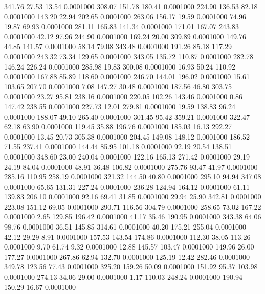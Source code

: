  341.76   27.53   13.54   0.0001000
 308.07  151.78  180.41   0.0001000
 224.90  136.53   82.18   0.0001000
 143.20   22.94  202.65   0.0001000
 263.06  156.17   19.59   0.0001000
  74.96   19.87   69.93   0.0001000
 281.11  165.83  141.34   0.0001000
 171.01  167.07  243.83   0.0001000
  42.12   97.96  244.90   0.0001000
 169.24   20.00  309.89   0.0001000
 149.76   44.85  141.57   0.0001000
  58.14   79.08  343.48   0.0001000
 191.26   85.18  117.29   0.0001000
 243.32   73.34  129.65   0.0001000
 343.05  135.72  110.87   0.0001000
 282.78  146.24  226.24   0.0001000
 285.98   19.83  300.08   0.0001000
  16.93   50.24  110.92   0.0001000
 167.88   85.89  118.60   0.0001000
 246.70  144.01  196.02   0.0001000
  15.61  103.65  207.70   0.0001000
   7.08  147.27   30.48   0.0001000
 187.56   46.80  303.75   0.0001000
  23.27   95.81  238.16   0.0001000
 220.05  102.26  143.46   0.0001000
   0.86  147.42  238.55   0.0001000
 227.73   12.01  279.81   0.0001000
  19.59  138.83   96.24   0.0001000
 188.07   49.10  265.40   0.0001000
 301.45   95.42  359.21   0.0001000
 322.47   62.18   63.90   0.0001000
 119.45   35.88  196.76   0.0001000
 185.03   16.13  292.27   0.0001000
  13.45   20.73  305.38   0.0001000
 204.45  149.08  148.12   0.0001000
 186.52   71.55  237.41   0.0001000
 144.44   85.95  101.18   0.0001000
  92.19   20.54  138.51   0.0001000
 348.60   23.00  240.04   0.0001000
 122.16  165.13  271.42   0.0001000
  29.19   24.19   84.04   0.0001000
  48.91   36.48  106.82   0.0001000
 275.76   93.47   41.97   0.0001000
 285.16  110.95  258.19   0.0001000
 321.32  144.50   40.80   0.0001000
 295.10   94.94  347.08   0.0001000
  65.65  131.31  227.24   0.0001000
 236.28  124.94  164.12   0.0001000
  61.11  139.83  206.10   0.0001000
  92.16   69.41   31.85   0.0001000
  29.94   25.90  342.81   0.0001000
 223.08  151.12   69.05   0.0001000
 290.71  116.56  304.79   0.0001000
 258.65   73.02  167.22   0.0001000
   2.65  129.85  196.42   0.0001000
  41.17   35.46  190.95   0.0001000
 343.38   64.06   98.76   0.0001000
  36.51  145.85  314.61   0.0001000
  40.20  175.21  255.04   0.0001000
  42.12   29.29    8.91   0.0001000
 157.53  143.54  174.86   0.0001000
 112.30   38.05  113.26   0.0001000
   9.70   61.74    9.32   0.0001000
  12.88  145.57  103.47   0.0001000
 149.96   26.00  177.27   0.0001000
 267.86   62.94  132.70   0.0001000
 125.19   12.42  282.46   0.0001000
 349.78  123.56   77.43   0.0001000
 325.20  159.26   50.09   0.0001000
 151.92   95.37  103.98   0.0001000
 274.13   34.06   29.00   0.0001000
   1.17  110.03  248.24   0.0001000
 190.94  150.29   16.67   0.0001000
